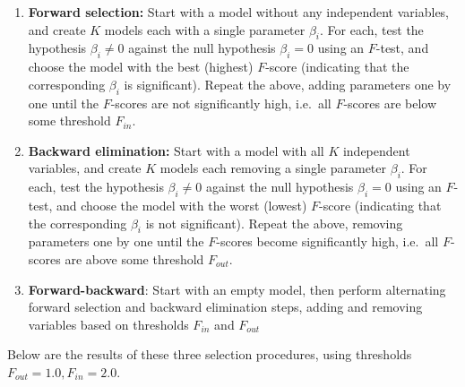 \documentclass[10pt]{article}
\begin{document}
    \begin{enumerate}
        \item \textbf{Forward selection:} Start with a model without any independent
        variables, and create $K$ models each with a single parameter $\beta_i$. For
        each, test the hypothesis $\beta_i \neq 0$ against the null hypothesis
        $\beta_i = 0$ using an $F$-test, and choose the model with the best (highest)
        $F$-score (indicating that the corresponding $\beta_i$ is significant).
        Repeat the above, adding parameters one by one until the $F$-scores are not
        significantly high, i.e.\ all $F$-scores are below some threshold $F_{in}$.

        \item \textbf{Backward elimination:} Start with a model with all $K$
        independent variables, and create $K$ models each removing a single parameter
        $\beta_i$. For each, test the hypothesis $\beta_i \neq 0$ against the null
        hypothesis $\beta_i = 0$ using an $F$-test, and choose the model with the
        worst (lowest) $F$-score (indicating that the corresponding $\beta_i$ is not
        significant).  Repeat the above, removing parameters one by one until the
        $F$-scores become significantly high, i.e.\ all $F$-scores are above some
        threshold $F_{out}$.

        \item \textbf{Forward-backward}: Start with an empty model, then perform
        alternating forward selection and backward elimination steps, adding and
        removing variables based on thresholds $F_{in}$ and $F_{out}$
    \end{enumerate}

    Below are the results of these three selection procedures, using thresholds
    $F_{out} = 1.0, F_{in} = 2.0$.
\end{document}
